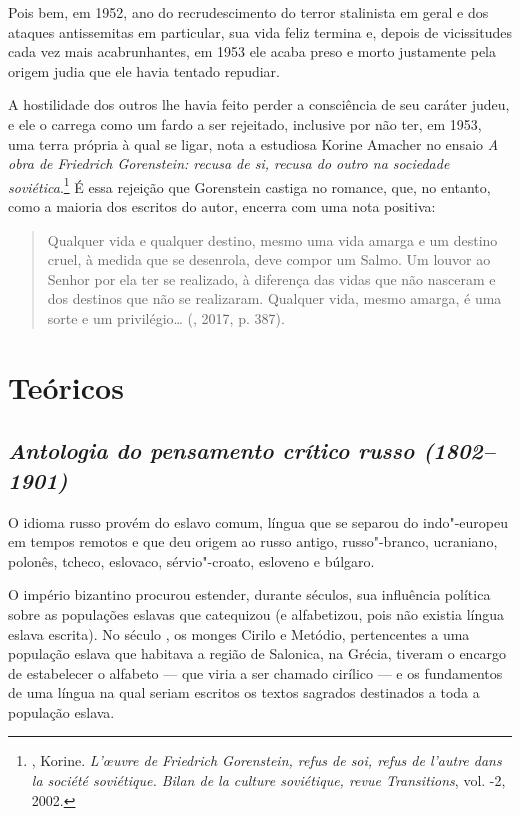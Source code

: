 Pois bem, em 1952, ano do recrudescimento do terror stalinista em geral
e dos ataques antissemitas em particular, sua vida feliz termina e,
depois de vicissitudes cada vez mais acabrunhantes, em 1953 ele acaba
preso e morto justamente pela origem judia que ele havia tentado
repudiar.

A hostilidade dos outros lhe havia feito perder a consciência de seu
caráter judeu, e ele o carrega como um fardo a ser rejeitado,
inclusive por não ter, em 1953, uma terra própria à qual se ligar, nota
a estudiosa Korine Amacher no ensaio \emph{A obra de Friedrich
Gorenstein: recusa de si, recusa do outro na sociedade 
soviética}.\footnote{, Korine. \emph{L’œuvre de
 Friedrich Gorenstein, refus de soi, refus de l'autre dans la société
 soviétique. Bilan de la culture soviétique, revue Transitions}, vol.
 -2, 2002.} É essa rejeição que Gorenstein castiga no romance, que, no entanto, como a maioria dos escritos do autor, encerra com
uma nota positiva: 

\begin{quotation}
Qualquer vida e qualquer destino, mesmo uma
vida amarga e um destino cruel, à medida que se desenrola, deve compor um
Salmo. Um louvor ao Senhor por ela ter se realizado, à diferença das vidas
que não nasceram e dos destinos que não se realizaram. Qualquer vida,
mesmo amarga, é uma sorte e um privilégio\ldots{} (, 2017, p. 387).
\end{quotation}

\part{Teóricos}

\chapter{\emph{Antologia do pensamento crítico russo (1802--1901)}}

O idioma russo provém do eslavo comum, língua que se separou do
indo"-europeu em tempos remotos e que deu origem ao russo antigo,
russo"-branco, ucraniano, polonês, tcheco, eslovaco, sérvio"-croato,
esloveno e búlgaro.

O império bizantino procurou estender, durante séculos, sua influência
política sobre as populações eslavas que catequizou (e alfabetizou, pois
não existia língua eslava escrita). No século , os monges Cirilo e
Metódio, pertencentes a uma população eslava que habitava a região de
Salonica, na Grécia, tiveram o encargo de estabelecer o alfabeto --- que
viria a ser chamado cirílico --- e os fundamentos de uma língua na qual
seriam escritos os textos sagrados destinados a toda a população eslava.


